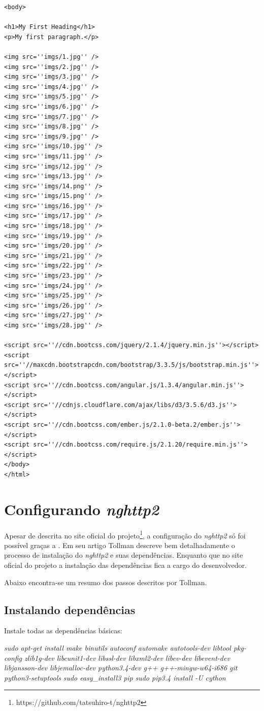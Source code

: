 \begin{apendicesenv}
\begin{lstlisting}
<body>

<h1>My First Heading</h1>
<p>My first paragraph.</p>
	
<img src=''imgs/1.jpg'' />
<img src=''imgs/2.jpg'' />
<img src=''imgs/3.jpg'' />
<img src=''imgs/4.jpg'' />
<img src=''imgs/5.jpg'' />
<img src=''imgs/6.jpg'' />
<img src=''imgs/7.jpg'' />
<img src=''imgs/8.jpg'' />
<img src=''imgs/9.jpg'' />
<img src=''imgs/10.jpg'' />
<img src=''imgs/11.jpg'' />
<img src=''imgs/12.jpg'' />
<img src=''imgs/13.jpg'' />
<img src=''imgs/14.png'' />
<img src=''imgs/15.png'' />
<img src=''imgs/16.jpg'' />
<img src=''imgs/17.jpg'' />
<img src=''imgs/18.jpg'' />
<img src=''imgs/19.jpg'' />
<img src=''imgs/20.jpg'' />
<img src=''imgs/21.jpg'' />
<img src=''imgs/22.jpg'' />
<img src=''imgs/23.jpg'' />
<img src=''imgs/24.jpg'' />
<img src=''imgs/25.jpg'' />
<img src=''imgs/26.jpg'' />
<img src=''imgs/27.jpg'' />
<img src=''imgs/28.jpg'' />

<script src=''//cdn.bootcss.com/jquery/2.1.4/jquery.min.js''></script>
<script src=''//maxcdn.bootstrapcdn.com/bootstrap/3.3.5/js/bootstrap.min.js''></script>
<script src=''//cdn.bootcss.com/angular.js/1.3.4/angular.min.js''></script>
<script src=''//cdnjs.cloudflare.com/ajax/libs/d3/3.5.6/d3.js''></script>
<script src=''//cdn.bootcss.com/ember.js/2.1.0-beta.2/ember.js''></script>
<script src=''//cdn.bootcss.com/require.js/2.1.20/require.min.js''></script>	
</body>
</html>

\end{lstlisting}

\chapter{Configurando \textit{nghttp2}}
\label{apend:configurandonghttp2}

Apesar de descrita no site oficial do projeto\footnote{https://github.com/tatsuhiro-t/nghttp2}, a configuração do \textit{nghttp2} só foi possível graças a . Em seu artigo Tollman descreve bem detalhadamente o processo de instalação do \textit{nghttp2} e suas dependências. Enquanto que no site oficial do projeto a instalação das dependências fica a cargo do desenvolvedor. 

Abaixo encontra-se um resumo dos passos descritos por Tollman.

\section{Instalando dependências}
Instale todas as dependências básicas:
	\begin{center}
		\textit{sudo apt-get install make binutils autoconf automake autotools-dev libtool pkg-config zlib1g-dev libcunit1-dev libssl-dev libxml2-dev libev-dev libevent-dev libjansson-dev libjemalloc-dev python3.4-dev g++ g++-mingw-w64-i686 git python3-setuptools}	
		\textit{sudo easy\_install3 pip}
		\textit{sudo pip3.4 install -U cython}
	\end{center}


\end{apendicesenv}

